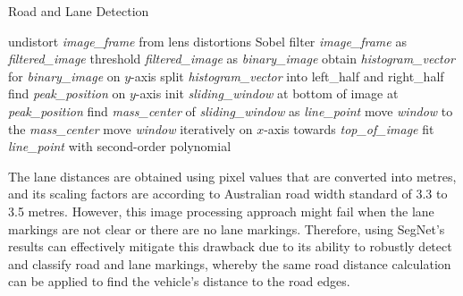 \begin{algorithm}
	\begin{flushleft}
		\caption{Road and Lane Detection}\label{algo:7:lanes}
		\begin{algorithmic}[1]
			\State undistort \textit{image\_frame} from lens distortions
			\State Sobel filter \textit{image\_frame} as \textit{filtered\_image}
			\State threshold \textit{filtered\_image} as \textit{binary\_image}
			\State obtain \textit{histogram\_vector} for \textit{binary\_image} on $y$-axis
			\State split \textit{histogram\_vector} into left\_half and right\_half
			\State find \textit{peak\_position} on $y$-axis
			\State init \textit{sliding\_window} at bottom of image at \textit{peak\_position}
			\State find \textit{mass\_center} of \textit{sliding\_window} as \textit{line\_point}
			\State move \textit{window} to the \textit{mass\_center}
			\State move \textit{window} iteratively on $x$-axis towards \textit{top\_of\_image}
			\EndWhile
			\State fit \textit{line\_point} with second-order polynomial
			\EndFor
			\EndProcedure
		\end{algorithmic}
	\end{flushleft}
\end{algorithm}

The lane distances are obtained using pixel values that are converted into metres, and its scaling factors are according to Australian road width standard of 3.3 to 3.5 metres. However, this image processing approach might fail when the lane markings are not clear or there are no lane markings. Therefore, using SegNet's results can effectively mitigate this drawback due to its ability to robustly detect and classify road and lane markings, whereby the same road distance calculation can be applied to find the vehicle's distance to the road edges.

